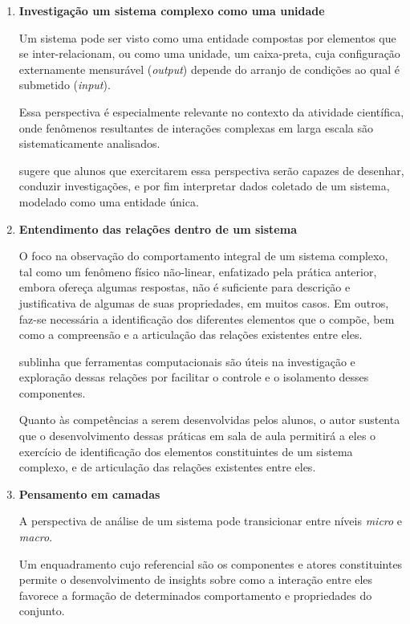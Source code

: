 \begin{enumerate}
  \item \textbf{Investigação um sistema complexo como uma unidade}

  Um sistema pode ser visto como uma entidade compostas por elementos que se inter-relacionam, ou como uma unidade, um caixa-preta, cuja configuração externamente mensurável (\textit{output}) depende do arranjo de condições ao qual é submetido (\textit{input}).

  Essa perspectiva é especialmente relevante no contexto da atividade científica, onde fenômenos resultantes de interações complexas em larga escala são sistematicamente analisados.

   sugere que alunos que exercitarem essa perspectiva serão capazes de desenhar, conduzir investigações, e por fim interpretar dados coletado de um sistema, modelado como uma entidade única.


  \item \textbf{Entendimento das relações dentro de um sistema} 
  
  O foco na observação do comportamento integral de um sistema complexo, tal como um fenômeno físico não-linear, enfatizado pela prática anterior, embora ofereça algumas respostas, não é suficiente para descrição e justificativa de algumas de suas propriedades, em muitos casos. Em outros, faz-se necessária a identificação dos diferentes elementos que o compõe, bem como a compreensão e a articulação das relações existentes entre eles.

   sublinha que ferramentas computacionais são úteis na investigação e exploração dessas relações por facilitar o controle e o isolamento desses componentes.

  Quanto às competências a serem desenvolvidas pelos alunos, o autor sustenta que o desenvolvimento dessas práticas em sala de aula permitirá a eles o exercício de identificação dos elementos constituintes de um sistema complexo, e de articulação das relações existentes entre eles.

  \item \textbf{Pensamento em camadas}

  A perspectiva de análise de um sistema pode transicionar entre níveis \textit{micro} e \textit{macro}. 

  Um enquadramento cujo referencial são os componentes e atores constituintes permite o desenvolvimento de insights sobre como a interação entre eles favorece a formação de determinados comportamento e propriedades do conjunto. 


\end{enumerate}
